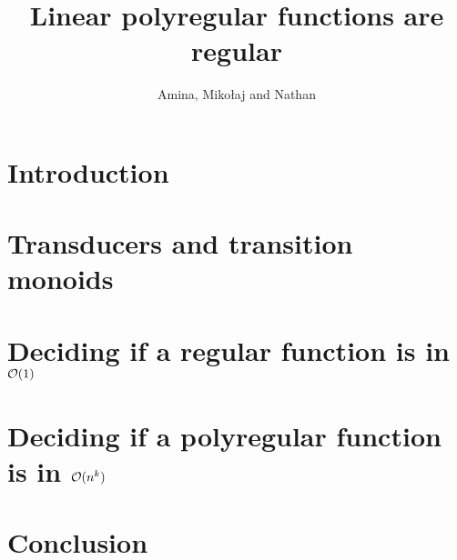 \documentclass{article}
\begin{document}
 \title{Linear polyregular functions are regular}
 \author{Amina, Miko\l aj and Nathan}
 \maketitle

\tableofcontents

\section*{Introduction}

\section{Transducers and transition monoids}

\section{Deciding if a regular function is in ${\mathcal O}(1)$}

\section{Deciding if a polyregular function is in ${\mathcal O}(n^k)$}

\section{Conclusion}




\end{document}

